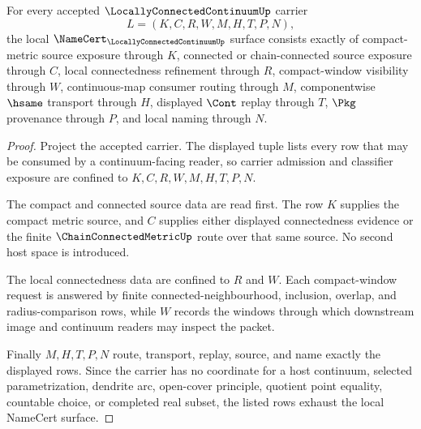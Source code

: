 \begin{theorem}
\label{thm:locally-connected-continuum-namecert-obligations}
For every accepted $\LocallyConnectedContinuumUp$ carrier
$$
L=(K,C,R,W,M,H,T,P,N),
$$
the local $\NameCert_{\LocallyConnectedContinuumUp}$ surface consists exactly of compact-metric source exposure through $K$, connected or chain-connected source exposure through $C$, local connectedness refinement through $R$, compact-window visibility through $W$, continuous-map consumer routing through $M$, componentwise $\hsame$ transport through $H$, displayed $\Cont$ replay through $T$, $\Pkg$ provenance through $P$, and local naming through $N$.
\end{theorem}
\begin{proof}
Project the accepted carrier. The displayed tuple lists every row that may be consumed by a continuum-facing reader, so carrier admission and classifier exposure are confined to $K,C,R,W,M,H,T,P,N$.

The compact and connected source data are read first. The row $K$ supplies the compact metric source, and $C$ supplies either displayed connectedness evidence or the finite $\ChainConnectedMetricUp$ route over that same source. No second host space is introduced.

The local connectedness data are confined to $R$ and $W$. Each compact-window request is answered by finite connected-neighbourhood, inclusion, overlap, and radius-comparison rows, while $W$ records the windows through which downstream image and continuum readers may inspect the packet.

Finally $M,H,T,P,N$ route, transport, replay, source, and name exactly the displayed rows. Since the carrier has no coordinate for a host continuum, selected parametrization, dendrite arc, open-cover principle, quotient point equality, countable choice, or completed real subset, the listed rows exhaust the local NameCert surface.
\end{proof}

